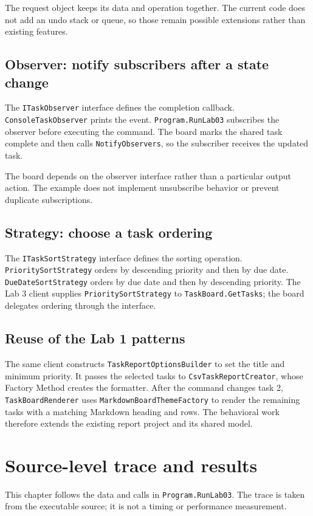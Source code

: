 \documentclass{utmreport}
\begin{document}
The request object keeps its data and operation together. The current code does not add an undo stack or queue, so those remain possible extensions rather than existing features.

\section{Observer: notify subscribers after a state change}
The \texttt{ITaskObserver} interface defines the completion callback. \texttt{ConsoleTaskObserver} prints the event. \texttt{Program.RunLab03} subscribes the observer before executing the command. The board marks the shared task complete and then calls \texttt{NotifyObservers}, so the subscriber receives the updated task.

The board depends on the observer interface rather than a particular output action. The example does not implement unsubscribe behavior or prevent duplicate subscriptions.

\section{Strategy: choose a task ordering}
The \texttt{ITaskSortStrategy} interface defines the sorting operation. \texttt{PrioritySortStrategy} orders by descending priority and then by due date. \texttt{DueDateSortStrategy} orders by due date and then by descending priority. The Lab 3 client supplies \texttt{PrioritySortStrategy} to \texttt{TaskBoard.GetTasks}; the board delegates ordering through the interface.

\section{Reuse of the Lab 1 patterns}
The same client constructs \texttt{TaskReportOptionsBuilder} to set the title and minimum priority. It passes the selected tasks to \texttt{CsvTaskReportCreator}, whose Factory Method creates the formatter. After the command changes task 2, \texttt{TaskBoardRenderer} uses \texttt{MarkdownBoardThemeFactory} to render the remaining tasks with a matching Markdown heading and rows. The behavioral work therefore extends the existing report project and its shared model.

\chapter{Source-level trace and results}
This chapter follows the data and calls in \texttt{Program.RunLab03}. The trace is taken from the executable source; it is not a timing or performance measurement.
\end{document}
